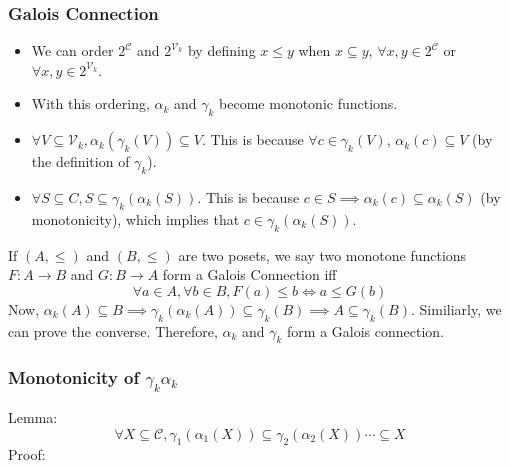 \documentclass{beamer}
\begin{document}
{        \begin{frame}
            \frametitle{Galois Connection}
            \begin{itemize}
                \item We can order $2^{\mathcal{C}}$ and $2^{\mathcal{V}_{k}}$ by defining $x \leq y$ when $x \subseteq y$, $\forall x, y \in 2^{\mathcal{C}}$ or $\forall x, y \in 2^{\mathcal{V}_{k}}$.
                \item With this ordering, $\alpha_{k}$ and $\gamma_{k}$ become monotonic functions.
                \item $\forall V \subseteq \mathcal{V}_{k}, \alpha_{k}(\gamma_{k}(V)) \subseteq V$. This is because $\forall c \in \gamma_{k}(V)$, $\alpha_{k}(c) \subseteq V$ (by the definition of $\gamma_{k}$).
                \item $\forall S \subseteq C, S \subseteq \gamma_{k}(\alpha_{k}(S))$. This is because $c \in S \implies \alpha_{k}(c) \subseteq \alpha_{k}(S)$ (by monotonicity), which implies that $c \in \gamma_{k}(\alpha_{k}(S))$.
            \end{itemize}
            If $(A, \leq)$ and $(B, \leq)$ are two posets, we say two monotone functions $F: A \rightarrow B$ and $G: B \rightarrow A$ form a Galois Connection iff
            \begin{equation*}
                \forall a \in A, \forall b \in B, F(a) \leq b \Leftrightarrow a \leq G(b)
            \end{equation*}
            Now, $\alpha_{k}(A) \subseteq B \implies \gamma_{k}(\alpha_{k}(A)) \subseteq \gamma_{k}(B) \implies A \subseteq \gamma_{k}(B)$. Similiarly, we can prove the converse. Therefore, $\alpha_{k}$ and $\gamma_{k}$ form a Galois connection.
        \end{frame}

        \begin{frame}
            \frametitle{Monotonicity of $\gamma_{k}\alpha_{k}$}
            Lemma:
            \begin{equation*}
                \forall X \subseteq \mathcal{C}, \gamma_{1}(\alpha_{1}(X)) \subseteq \gamma_{2}(\alpha_{2}(X)) \cdots \subseteq X
            \end{equation*}
            Proof:
            
        \end{frame}
    }

            
\end{document}
